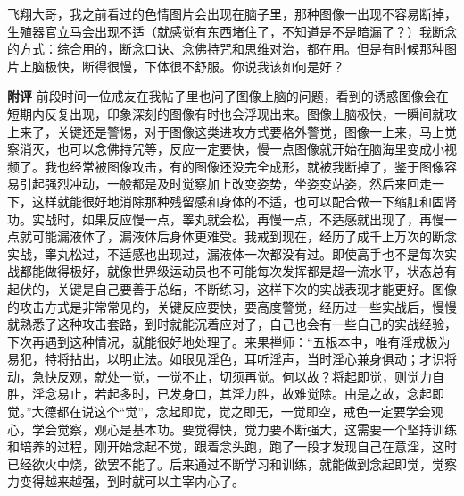 \begin{case}
    飞翔大哥，我之前看过的色情图片会出现在脑子里，那种图像一出现不容易断掉，生殖器官立马会出现不适（就感觉有东西堵住了，不知道是不是暗漏了？）我断念的方式：综合用的，断念口诀、念佛持咒和思维对治，都在用。但是有时候那种图片上脑极快，断得很慢，下体很不舒服。你说我该如何是好？

    \textbf{附评} 前段时间一位戒友在我帖子里也问了图像上脑的问题，看到的诱惑图像会在短期内反复出现，印象深刻的图像有时也会浮现出来。图像上脑极快，一瞬间就攻上来了，关键还是警惕，对于图像这类进攻方式要格外警觉，图像一上来，马上觉察消灭，也可以念佛持咒等，反应一定要快，慢一点图像就开始在脑海里变成小视频了。我也经常被图像攻击，有的图像还没完全成形，就被我断掉了，鉴于图像容易引起强烈冲动，一般都是及时觉察加上改变姿势，坐姿变站姿，然后来回走一下，这样就能很好地消除那种残留感和身体的不适，也可以配合做一下缩肛和固肾功。实战时，如果反应慢一点，睾丸就会松，再慢一点，不适感就出现了，再慢一点就可能漏液体了，漏液体后身体更难受。我戒到现在，经历了成千上万次的断念实战，睾丸松过，不适感也出现过，漏液体一次都没有过。即使高手也不是每次实战都能做得极好，就像世界级运动员也不可能每次发挥都是超一流水平，状态总有起伏的，关键是自己要善于总结，不断练习，这样下次的实战表现才能更好。图像的攻击方式是非常常见的，关键反应要快，要高度警觉，经历过一些实战后，慢慢就熟悉了这种攻击套路，到时就能沉着应对了，自己也会有一些自己的实战经验，下次再遇到这种情况，就能很好地处理了。来果禅师：“五根本中，唯有淫戒极为易犯，特将拈出，以明止法。如眼见淫色，耳听淫声，当时淫心兼身俱动；才识将动，急快反观，就处一觉，一觉不止，切须再觉。何以故？将起即觉，则觉力自胜，淫念易止，若起多时，已发身口，其淫力胜，故难觉除。由是之故，念起即觉。”大德都在说这个“觉”，念起即觉，觉之即无，一觉即空，戒色一定要学会观心，学会觉察，观心是基本功。要觉得快，觉力要不断强大，这需要一个坚持训练和培养的过程，刚开始念起不觉，跟着念头跑，跑了一段才发现自己在意淫，这时已经欲火中烧，欲罢不能了。后来通过不断学习和训练，就能做到念起即觉，觉察力变得越来越强，到时就可以主宰内心了。
\end{case}

